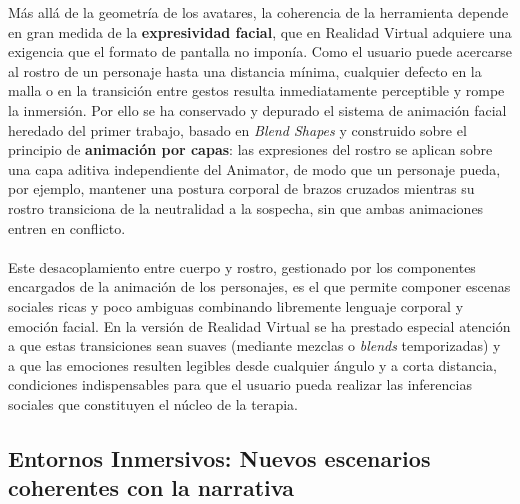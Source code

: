 \documentclass[12pt,twoside,titlepage]{report}
\begin{document}
Más allá de la geometría de los avatares, la coherencia de la herramienta depende en gran medida de la \textbf{expresividad facial}, que en Realidad Virtual adquiere una exigencia que el formato de pantalla no imponía.
Como el usuario puede acercarse al rostro de un personaje hasta una distancia mínima, cualquier defecto en la malla o en la transición entre gestos resulta inmediatamente perceptible y rompe la inmersión.
Por ello se ha conservado y depurado el sistema de animación facial heredado del primer trabajo, basado en \textit{Blend Shapes} y construido sobre el principio de \textbf{animación por capas}: las expresiones del rostro se aplican sobre una capa aditiva independiente del Animator, de modo que un personaje pueda, por ejemplo, mantener una postura corporal de brazos cruzados mientras su rostro transiciona de la neutralidad a la sospecha, sin que ambas animaciones entren en conflicto.\\
\\
Este desacoplamiento entre cuerpo y rostro, gestionado por los componentes encargados de la animación de los personajes, es el que permite componer escenas sociales ricas y poco ambiguas combinando libremente lenguaje corporal y emoción facial.
En la versión de Realidad Virtual se ha prestado especial atención a que estas transiciones sean suaves (mediante mezclas o \textit{blends} temporizadas) y a que las emociones resulten legibles desde cualquier ángulo y a corta distancia, condiciones indispensables para que el usuario pueda realizar las inferencias sociales que constituyen el núcleo de la terapia.

\subsection{Entornos Inmersivos: Nuevos escenarios coherentes con la narrativa}
\end{document}
